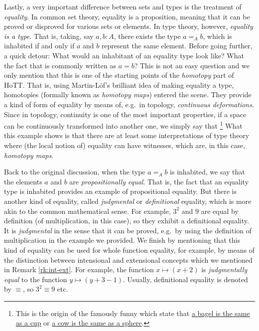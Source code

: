 Lastly, a very important difference between sets and types is the treatment
of \emph{equality}. In common set theory, equality is a proposition, meaning
that it can be proved or disproved for various sets or elements. In type theory,
however, \emph{equality is a type}. That is, taking, say $ a, b : A $, there
exists the type $ a =_A b $, which is inhabited if and only if $ a $ and $ b $
represent the same element. Before going further, a quick detour: What would
an inhabitant of an equality type look like? What  the fact
that is commonly written as $ a = b $? This is not an easy question and we only
mention that this is one of the starting points of the \emph{homotopy} part of
HoTT. That is, using Martin-L\"{o}f's brilliant idea of making equality a type,
homotopies (formally known as \emph{homotopy maps}) entered the scene. They
provide a kind of  form of equality by means of, e.g.\ in topology,
\emph{continuous deformations}. Since in topology, continuity is one of the
most important properties, if a space can be continuously transformed into
another one, we simply say that \footnote{This is the
  origin of the famously funny  which state that
  \href{https://upload.wikimedia.org/wikipedia/commons/2/26/Mug\_and\_Torus\_morph.gif}{%
    a bagel is the same as a cup} or
  \href{https://upload.wikimedia.org/wikipedia/commons/2/24/Spot\_the\_cow.gif}{%
    a cow is the same as a sphere}.}
What this example shows is that there are at least some interpretations of
type theory where (the local notion of) equality can have witnesses, which
are, in this case, \emph{homotopy maps}.

Back to the original discussion, when the type $ a =_A b $ is inhabited,
we say that the elements $ a $ and $ b $ are \emph{propositionally equal}.
That is, the fact that an equality type is inhabited provides an example
of propositional equality. But there is another kind of equality, called
\emph{judgmental} or \emph{definitional} equality, which is more akin to the
common mathematical sense. For example, $ 3^2 $ and $ 9 $ are equal by definition
(of multiplication, in this case), so they exhibit a definitional equality.
It is \emph{judgmental} in the sense that it can be proved, e.g.\ by using
the definition of multiplication in the example we provided. We finish by
mentioning that this kind of equality can be used for whole function equality,
for example, by means of the distinction between intensional and extensional
concepts which we mentioned in Remark \ref{rk:int-ext}. For example,
the function $ x \mapsto (x + 2) $ is \emph{judgmentally equal} to
the function $ y \mapsto (y + 3 - 1) $. Usually, definitional equality is
denoted by $ \equiv $, so $ 3^2 \equiv 9 $ etc.

